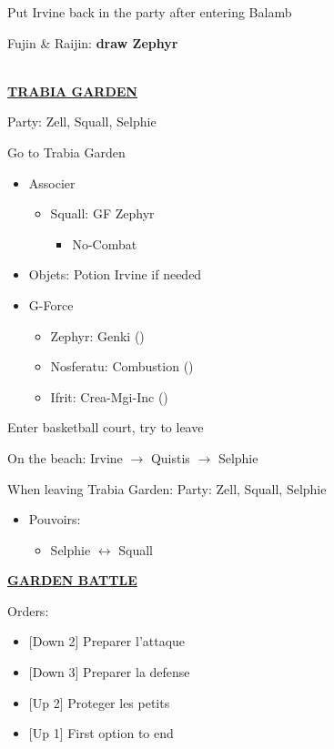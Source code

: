 Put Irvine back in the party after entering Balamb

Fujin \& Raijin: \textbf{draw Zephyr}

\leavevmode\\
\underline{\textbf{TRABIA GARDEN}}

Party: Zell, Squall, Selphie

Go to Trabia Garden

\begin{menu}
	\begin{itemize}
		\item Associer
			\begin{itemize}
				\item Squall: GF Zephyr
					\begin{itemize}
						\item No-Combat
					\end{itemize}
			\end{itemize}
		\item Objets: Potion Irvine if needed
		\item G-Force
			\begin{itemize}
				\item Zephyr: Genki ()
				\item Nosferatu: Combustion ()
				\item Ifrit: Crea-Mgi-Inc ()
			\end{itemize}
	\end{itemize}
\end{menu}

Enter basketball court, try to leave

On the beach: Irvine $\rightarrow$ Quistis $\rightarrow$ Selphie

When leaving Trabia Garden:
Party: Zell, Squall, Selphie
\begin{itemize}
	\item Pouvoirs:
		\begin{itemize}
			\item Selphie $\leftrightarrow$ Squall
		\end{itemize}
\end{itemize}

\underline{\textbf{GARDEN BATTLE}}

Orders:
\begin{itemize}
	\item {[Down 2]} Preparer l'attaque
	\item {[Down 3]} Preparer la defense
	\item {[Up 2]} Proteger les petits
	\item {[Up 1]} First option to end
\end{itemize}


